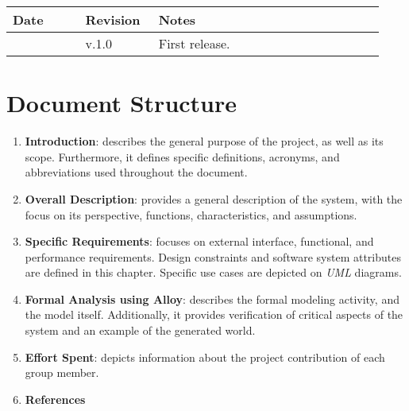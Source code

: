 \begin{center}
	\begin{longtable}{@{}p{0.18\linewidth} p{0.18\linewidth} p{0.57\linewidth}@{}}
		\toprule
		\textbf{Date}   & \textbf{Revision} & \textbf{Notes}\\
		\midrule
		\date{}         & v.1.0             & First release.\\
		\bottomrule
	\end{longtable}
\end{center}

\printbibliography[title={Reference Documents},keyword=intro, heading=subbibnumbered]

\section{Document Structure}

\begin{enumerate}
    \item \textbf{Introduction}: describes the general purpose of the project, as well as its scope. Furthermore, it defines specific definitions, acronyms, and abbreviations used throughout the document.
    \item \textbf{Overall Description}: provides a general description of the system, with the focus on its perspective, functions, characteristics, and assumptions.
    \item \textbf{Specific Requirements}: focuses on external interface, functional, and performance requirements. Design constraints and software system attributes are defined in this chapter. Specific use cases are depicted on \textit{UML} diagrams.
    \item \textbf{Formal Analysis using Alloy}: describes the formal modeling activity, and the model itself. Additionally, it provides verification of critical aspects of the system and an example of the generated world.
    \item \textbf{Effort Spent}: depicts information about the project contribution of each group member.
    \item \textbf{References}
\end{enumerate}

